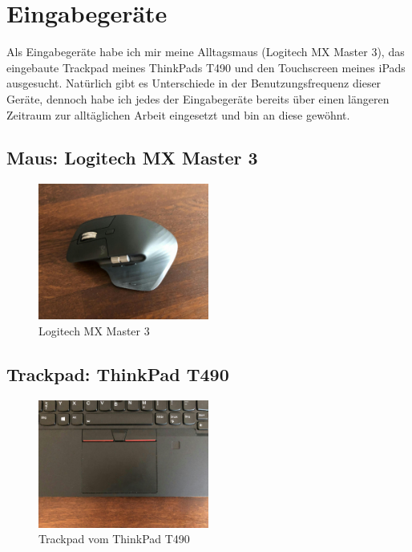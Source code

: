 \documentclass{article}
\begin{document}
\newpage

\section{Eingabegeräte}

Als Eingabegeräte habe ich mir meine Alltagsmaus (Logitech MX Master 3), das
eingebaute Trackpad meines ThinkPads T490 und den Touchscreen meines iPads
ausgesucht. Natürlich gibt es Unterschiede in der Benutzungsfrequenz dieser
Geräte, dennoch habe ich jedes der Eingabegeräte bereits über einen längeren
Zeitraum zur alltäglichen Arbeit eingesetzt und bin an diese gewöhnt.

\subsection{Maus: Logitech MX Master 3}

\begin{figure}[h!]
	\centering
	\includegraphics[width=0.5\textwidth]{maus.jpg}
	\caption{Logitech MX Master 3}
\end{figure}

\subsection{Trackpad: ThinkPad T490}

\begin{figure}[h!]
	\centering
	\includegraphics[width=0.5\textwidth]{trackpad}
	\caption{Trackpad vom ThinkPad T490}
\end{figure}
\end{document}
